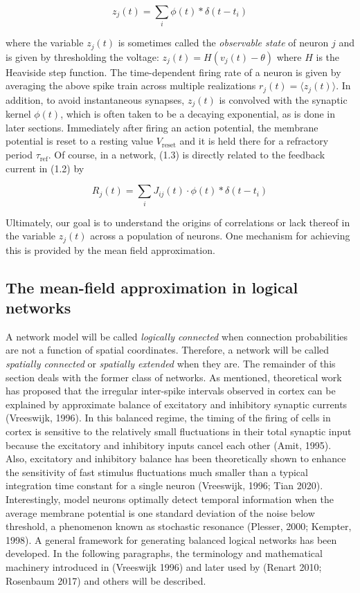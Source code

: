 \documentclass{ucetd}
\begin{document}
\begin{equation}
z_{j}(t) = \sum_{i} \phi(t) * \delta(t-t_{i})
\end{equation}

where the variable $z_{j}(t)$ is sometimes called the \emph{observable state} of neuron $j$ and is given by thresholding the voltage: $z_{j}(t) = H(v_{j}(t) - \theta)$ where $H$ is the Heaviside step function. The time-dependent firing rate of a neuron is given by averaging the above spike train across multiple realizations $r_{j}(t) = \langle z_{j}(t) \rangle$. In addition, to avoid instantaneous synapses, $z_{j}(t)$ is convolved with the synaptic kernel $\phi(t)$, which is often taken to be a decaying exponential, as is done in later sections. Immediately after firing an action potential, the membrane potential is reset to a resting value $V_{\mathrm{reset}}$ and it is held there for a refractory period $\tau_{\mathrm{ref}}$. Of course, in a network, (1.3) is directly related to the feedback current in (1.2) by 

\begin{equation}
R_{j}(t) = \sum_{i} J_{ij}(t)\cdot \phi(t) * \delta(t-t_{i})
\end{equation}

Ultimately, our goal is to understand the origins of correlations or lack thereof in the variable $z_{j}(t)$ across a population of neurons. One mechanism for achieving this is provided by the mean field approximation.

\subsection{The mean-field approximation in logical networks}

A network model will be called \emph{logically connected} when connection probabilities are not a function of spatial coordinates. Therefore, a network will be called \emph{spatially connected} or \emph{spatially extended} when they are. The remainder of this section deals with the former class of networks. As mentioned, theoretical work has proposed that the irregular inter-spike intervals observed in cortex can be explained by approximate balance of excitatory and inhibitory synaptic currents (Vreeswijk, 1996). In this balanced regime, the timing of the firing of cells in cortex is sensitive to the relatively small fluctuations in their total synaptic input because the excitatory and inhibitory inputs cancel each other (Amit, 1995). Also, excitatory and inhibitory balance has been theoretically shown to enhance the sensitivity of fast stimulus fluctuations much smaller than a typical integration time constant for a single neuron (Vreeswijk, 1996; Tian 2020). Interestingly, model neurons optimally detect temporal information when the average membrane potential is one standard deviation of the noise below threshold, a phenomenon known as stochastic resonance (Plesser, 2000; Kempter, 1998). A general framework for generating balanced logical networks has been developed. In the following paragraphs, the terminology and mathematical machinery introduced in (Vreeswijk 1996) and later used by (Renart 2010; Rosenbaum 2017) and others will be described.
\end{document}

